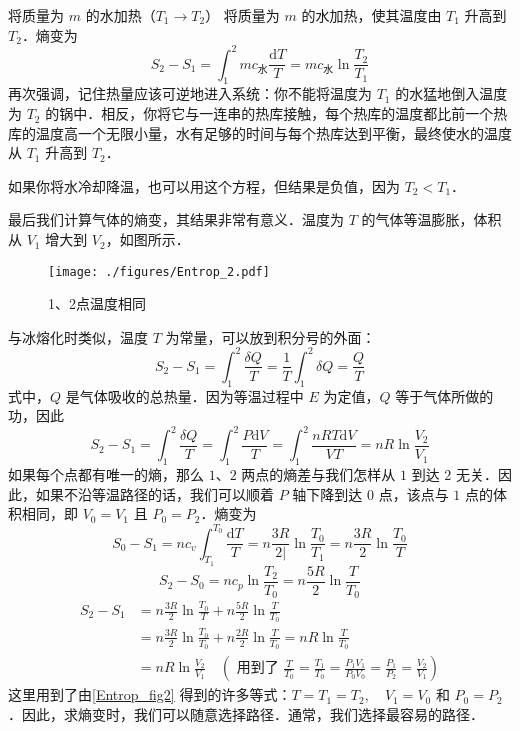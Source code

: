 \begin{example}{将质量为 $m $ 的水加热（$T_1\to T_2$）}
将质量为 $m$ 的水加热，使其温度由 $T_1$ 升高到 $T_2$．熵变为
\begin{equation}
S_2-S_1=\int_1^2{mc_{\text{水}}\frac{\text{d}T}{T}}=mc_{\text{水}}\ln \frac{T_2}{T_1}
\end{equation}
再次强调，记住热量应该可逆地进入系统：你不能将温度为 $T_1$ 的水猛地倒入温度为 $T_2$ 的锅中．相反，你将它与一连串的热库接触，每个热库的温度都比前一个热库的温度高一个无限小量，水有足够的时间与每个热库达到平衡，最终使水的温度从 $T_1$ 升高到 $T_2$．

如果你将水冷却降温，也可以用这个方程，但结果是负值，因为 $T_2<T_1$．

最后我们计算气体的熵变，其结果非常有意义．温度为 $T $ 的气体等温膨胀，体积从 $V_1$ 增大到 $V_2$，如图所示．
\begin{figure}[ht]
\centering
\texttt{[image: ./figures/Entrop\_2.pdf]}
\caption{1、2点温度相同} \label{Entrop_fig2}
\end{figure}
\end{example}
与冰熔化时类似，温度 $T $ 为常量，可以放到积分号的外面：
\begin{equation}
S_2-S_1=\int_1^2{\frac{\delta Q}{T}}=\frac{1}{T}\int_1^2{\delta Q=\frac{Q}{T}}
\end{equation}
式中，$ Q $ 是气体吸收的总热量．因为等温过程中 $E$ 为定值，$Q$ 等于气体所做的功，因此
\begin{equation}
S_2-S_1=\int_1^2{\frac{\delta Q}{T}}=\int_1^2{\frac{P\text{d}V}{T}}=\int_1^2{\frac{nRT\text{d}V}{VT}=nR\ln \frac{V_2}{V_1}}
\end{equation}
如果每个点都有唯一的熵，那么 $1$、$2$ 两点的熵差与我们怎样从 $1$ 到达 $2 $ 无关．因此，如果不沿等温路径的话，我们可以顺着 $P $ 轴下降到达 $0 $ 点，该点与 $1 $ 点的体积相同，即 $V_0=V_1$ 且 $P_0=P_2$．熵变为
\begin{equation}
S_{0}-S_{1}=n c_{v} \int_{T_{1}}^{T_{0}} \frac{\mathrm{d} T}{T}=n \frac{3 R}{2 |} \ln \frac{T_{0}}{T_{1}}=n \frac{3 R}{2} \ln \frac{T_{0}}{T}
\end{equation}
\begin{equation}
S_{2}-S_{0}=n c_{p} \ln \frac{T_{2}}{T_{0}}=n \frac{5 R}{2} \ln \frac{T}{T_{0}}
\end{equation}
\begin{equation}
\begin{aligned} S_{2}-S_{1} &=n \frac{3 R}{2} \ln \frac{T_{0}}{T}+n \frac{5 R}{2} \ln \frac{T}{T_{0}} \\ &=n \frac{3 R}{2} \ln \frac{T_{0}}{T_{0}}+n \frac{2 R}{2} \ln \frac{T}{T_{0}}=n R \ln \frac{T}{T_{0}} \\ &=n R \ln \frac{V_{2}}{V_{1}} \quad\left(\text { 用到了 } \frac{T}{T_{0}}=\frac{T_{1}}{T_{0}}=\frac{P_{1} V_{1}}{P_{0} V_{0}}=\frac{P_{1}}{P_{2}}=\frac{V_{2}}{V_{1}}\right) \end{aligned}
\end{equation}
这里用到了由\autoref{Entrop_fig2} 得到的许多等式：$T=T_{1}=T_{2}, \quad V_{1}=V_{0} \text { 和 } P_{0}=P_{2}$．因此，求熵变时，我们可以随意选择路径．通常，我们选择最容易的路径．


